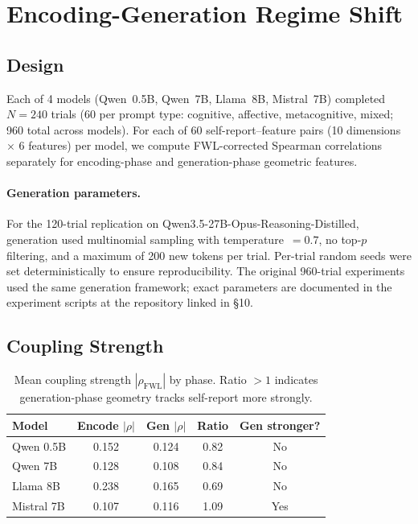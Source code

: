 \documentclass[11pt,a4paper]{article}
\begin{document}
\section{Encoding-Generation Regime Shift}

\subsection{Design}

Each of 4 models (Qwen~0.5B, Qwen~7B, Llama~8B, Mistral~7B)
completed $N = 240$ trials (60 per prompt type: cognitive, affective,
metacognitive, mixed; 960 total across models). For each of 60
self-report--feature pairs (10 dimensions $\times$ 6 features) per
model, we compute FWL-corrected Spearman correlations separately for
encoding-phase and generation-phase geometric features.

\paragraph{Generation parameters.} For the 120-trial replication on
Qwen3.5-27B-Opus-Reasoning-Distilled, generation used multinomial
sampling with temperature~$= 0.7$, no top-$p$ filtering, and a maximum
of 200 new tokens per trial. Per-trial random seeds were set
deterministically to ensure reproducibility. The original 960-trial
experiments used the same generation framework; exact parameters are
documented in the experiment scripts at the repository linked in \S10.

\subsection{Coupling Strength}

\begin{table}[H]
\centering
\caption{Mean coupling strength $|\rho_{\text{FWL}}|$ by phase. Ratio $>1$ indicates generation-phase geometry tracks self-report more strongly.}
\label{tab:coupling_strength}
\begin{tabular}{lcccc}
\toprule
\textbf{Model} & \textbf{Encode $|\rho|$} & \textbf{Gen $|\rho|$} & \textbf{Ratio} & \textbf{Gen stronger?} \\
\midrule
Qwen 0.5B  & 0.152 & 0.124 & 0.82 & No  \\
Qwen 7B    & 0.128 & 0.108 & 0.84 & No  \\
Llama 8B   & 0.238 & 0.165 & 0.69 & No  \\
Mistral 7B & 0.107 & 0.116 & 1.09 & Yes \\
\bottomrule
\end{tabular}
\end{table}
\end{document}
